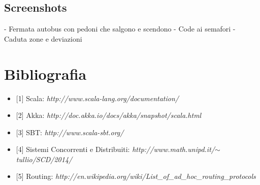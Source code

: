 \documentclass{article}
\newcommand{\Versione}{1.0}
\begin{document}
\subsection{Screenshots}
- Fermata autobus con pedoni che salgono e scendono \newline
- Code ai semafori \newline
- Caduta zone e deviazioni

\newpage

\pagestyle{fancy}

\chead{}
\rhead{
	\color{black}
	\bfseries \textsf{\normalsize v.\Versione\\} 
}
\section{Bibliografia}
\begin{itemize}
\item {[1]} Scala: \textit{http://www.scala-lang.org/documentation/}
\item {[2]} Akka: \textit{http://doc.akka.io/docs/akka/snapshot/scala.html}
\item {[3]} SBT: \textit{http://www.scala-sbt.org/}
\item {[4]} Sistemi Concorrenti e Distribuiti: \textit{http://www.math.unipd.it/$\sim$tullio/SCD/2014/}
\item {[5]} Routing: \textit{http://en.wikipedia.org/wiki/List\_of\_ad\_hoc\_routing\_protocols}
\end{itemize}
\begin{midpage}
\begin{center}
\null
\end{center}
\end{midpage}
\end{document}
